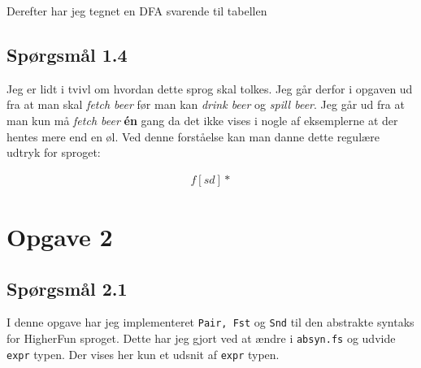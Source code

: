 \documentclass[danish,a4paper]{report}
\begin{document}
Derefter har jeg tegnet en DFA svarende til tabellen

\begin{center}
\end{center}
\section*{Spørgsmål 1.4}

Jeg er lidt i tvivl om hvordan dette sprog skal tolkes. Jeg går derfor i opgaven ud fra at man skal \textit{fetch beer} før man kan \textit{drink beer} og \textit{spill beer}. Jeg går ud fra at man kun må \textit{fetch beer} \textbf{én} gang da det ikke vises i nogle af eksemplerne at der hentes mere end en øl. Ved denne forståelse kan man danne dette regulære udtryk for sproget:

\begin{align*}
f[sd]*
\end{align*}

\chapter*{Opgave 2}
\section*{Spørgsmål 2.1}

I denne opgave har jeg implementeret \texttt{Pair, Fst} og \texttt{Snd} til den abstrakte syntaks for HigherFun sproget. Dette har jeg gjort ved at ændre i \texttt{absyn.fs} og udvide \texttt{expr} typen. Der vises her kun et udsnit af \texttt{expr} typen.
\end{document}
